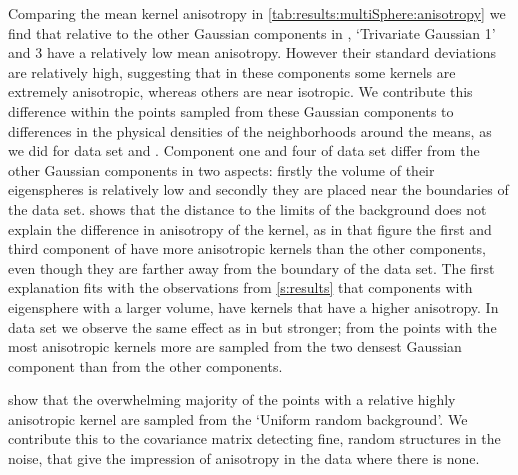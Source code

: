 			Comparing the mean kernel anisotropy in \cref{tab:results:multiSphere:anisotropy} we find that relative to the other Gaussian components in \ferdosiThree, `Trivariate Gaussian 1' and 3 have a relatively low mean anisotropy. However their standard deviations are relatively high, suggesting that in these components some kernels are extremely anisotropic, whereas others are near isotropic. We contribute this difference within the points sampled from these Gaussian components to differences in the physical densities of the neighborhoods around the means, as we did for data set \ferdosiOne and \baakmanOne.
			Component one and four of data set \ferdosiThree differ from the other Gaussian components in two aspects: firstly the volume of their eigenspheres is relatively low and secondly they are placed near the boundaries of the data set. 
				 shows that the distance to the limits of the background does not explain the difference in anisotropy of the kernel, as in that figure the first and third component of \ferdosiThreeNoise have more anisotropic kernels than the other components, even though they are farther away from the boundary of the data set.
				The first explanation fits with the observations from \cref{s:results} that components with eigensphere with a larger volume, have kernels that have a higher anisotropy.
			In data set \baakmanThree we observe the same effect as in \ferdosiThree but stronger; from the points with the most anisotropic kernels more are sampled from the two densest Gaussian component than from the other components. 

	 show that the overwhelming majority of the points with a relative highly anisotropic kernel are sampled from the `Uniform random background'. We contribute this to the covariance matrix detecting fine, random structures in the noise, that give the impression of anisotropy in the data where there is none.


